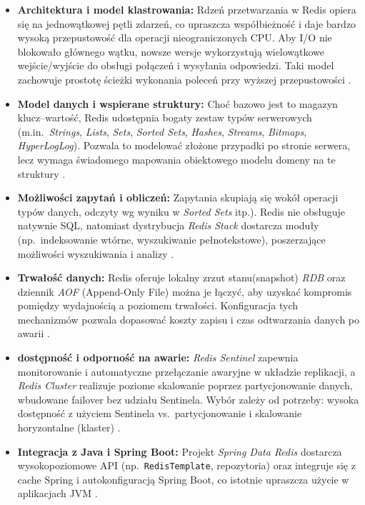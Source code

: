\begin{itemize}
  \item \textbf{Architektura i model klastrowania:}
        Rdzeń przetwarzania w Redis opiera się na jednowątkowej pętli zdarzeń, co upraszcza współbieżność
        i daje bardzo wysoką przepustowość dla operacji nieograniczonych CPU. Aby I/O nie blokowało głównego wątku,
        nowsze wersje wykorzystują wielowątkowe wejście/wyjście do obsługi połączeń i wysyłania odpowiedzi.
        Taki model zachowuje prostotę ścieżki wykonania poleceń przy wyższej przepustowości \cite{redis-docs}.

  \item \textbf{Model danych i wspierane struktury:}
        Choć bazowo jest to magazyn klucz–wartość, Redis udostępnia bogaty zestaw typów serwerowych
        (m.in.\ \emph{Strings}, \emph{Lists}, \emph{Sets}, \emph{Sorted Sets}, \emph{Hashes}, \emph{Streams},
        \emph{Bitmaps}, \emph{HyperLogLog}).
        Pozwala to modelować złożone przypadki po stronie serwera, lecz wymaga świadomego mapowania
        obiektowego modelu domeny na te struktury \cite{redis-docs}.

  \item \textbf{Możliwości zapytań i obliczeń:}
        Zapytania skupiają się wokół operacji typów danych,
        odczyty wg wyniku w \emph{Sorted Sets} itp.). Redis nie obsługuje natywnie SQL, natomiast
        dystrybucja \emph{Redis Stack} dostarcza moduły (np.\ indeksowanie wtórne, wyszukiwanie pełnotekstowe),
        poszerzające możliwości wyszukiwania i analizy \cite{redis-docs}.

  \item \textbf{Trwałość danych:}
        Redis oferuje lokalny zrzut stanu(snapshot) \emph{RDB} oraz dziennik \emph{AOF} (Append-Only File) można je łączyć,
        aby uzyskać kompromis pomiędzy wydajnością a poziomem trwałości. Konfiguracja tych mechanizmów
        pozwala dopasować koszty zapisu i czas odtwarzania danych po awarii \cite{redis-docs}.

  \item \textbf{dostępność i odporność na awarie:}
        \emph{Redis Sentinel} zapewnia monitorowanie i automatyczne przełączanie awaryjne w układzie
        replikacji, a \emph{Redis Cluster} realizuje poziome skalowanie poprzez partycjonowanie danych, wbudowane failover bez udziału Sentinela. Wybór zależy od potrzeby:
        wysoka dostępność z użyciem Sentinela vs.\ partycjonowanie i skalowanie horyzontalne (klaster) \cite{redis-docs}.

  \item \textbf{Integracja z Java i Spring Boot:}
        Projekt \emph{Spring Data Redis} dostarcza wysokopoziomowe API (np.\ \texttt{RedisTemplate},
        repozytoria) oraz integruje się z cache Spring i autokonfiguracją Spring Boot,
        co istotnie upraszcza użycie w aplikacjach JVM \cite{spring-docs}.
\end{itemize}

